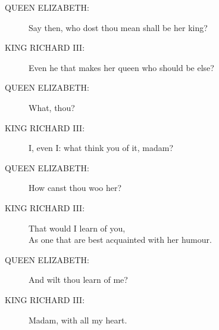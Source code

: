 \documentclass{article}
\begin{document}
\begin{description}
\item[QUEEN ELIZABETH:] 
\hspace{1pt}Say then, who dost thou mean shall be her king?\\
\end{description}
\begin{description}
\item[KING RICHARD III:] 
\hspace{1pt}Even he that makes her queen who should be else?\\
\end{description}
\begin{description}
\item[QUEEN ELIZABETH:] 
\hspace{1pt}What, thou?\\
\end{description}
\begin{description}
\item[KING RICHARD III:] 
\hspace{1pt}I, even I: what think you of it, madam?\\
\end{description}
\begin{description}
\item[QUEEN ELIZABETH:] 
\hspace{1pt}How canst thou woo her?\\
\end{description}
\begin{description}
\item[KING RICHARD III:] 
\hspace{1pt}That would I learn of you,\\
\hspace{1pt}As one that are best acquainted with her humour.\\
\end{description}
\begin{description}
\item[QUEEN ELIZABETH:] 
\hspace{1pt}And wilt thou learn of me?\\
\end{description}
\begin{description}
\item[KING RICHARD III:] 
\hspace{1pt}Madam, with all my heart.\\
\end{description}
\end{document}
